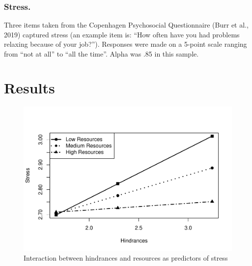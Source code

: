 \documentclass[
  man]{apa6}
\begin{document}
\hypertarget{stress.}{%
\subsubsection{Stress.}\label{stress.}}

Three items taken from the Copenhagen Psychosocial Questionnaire (Burr et al., 2019) captured stress (an example item is: ``How often have you had problems relaxing because of your job?''). Responses were made on a 5-point scale ranging from ``not at all'' to ``all the time''. Alpha was .85 in this sample.

\hypertarget{results}{%
\section{Results}\label{results}}

\begin{figure}
\centering
\includegraphics{SIOP_PROCESS_files/figure-latex/analyses-1.pdf}
\caption{\label{fig:analyses}Interaction between hindrances and resources as predictors of stress}
\end{figure}
\end{document}
